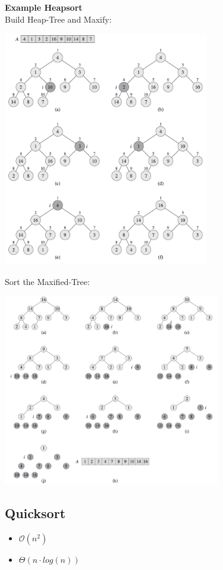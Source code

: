 \documentclass[10pt,a4paper,twocolumn]{article}
\begin{document}
\textbf{Example Heapsort}\\
Build Heap-Tree and Maxify:
\begin{center}
	\includegraphics[width=9cm]{images/heapsort-example1}
\end{center}
\newpage
Sort the Maxified-Tree:
\begin{center}
	\includegraphics[width=9.5cm]{images/heapsort-example2}
\end{center}


\subsection{Quicksort}
\begin{itemize}
	\item $\mathcal{O}(n^2)$
	\item $\Theta(n \cdot log(n))$
\end{itemize}
\end{document}
